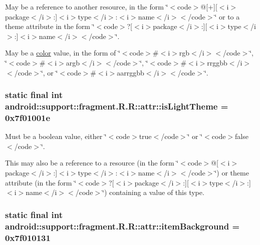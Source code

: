 May be a reference to another resource, in the form \char`\"{}$<$code$>$@\mbox{[}+\mbox{]}\mbox{[}$<$i$>$package$<$/i$>$:\mbox{]}$<$i$>$type$<$/i$>$:$<$i$>$name$<$/i$>$$<$/code$>$\char`\"{} or to a theme attribute in the form \char`\"{}$<$code$>$?\mbox{[}$<$i$>$package$<$/i$>$:\mbox{]}\mbox{[}$<$i$>$type$<$/i$>$:\mbox{]}$<$i$>$name$<$/i$>$$<$/code$>$\char`\"{}. 

May be a \hyperlink{classandroid_1_1support_1_1fragment_1_1_r_1_1color}{color} value, in the form of \char`\"{}$<$code$>$\#$<$i$>$rgb$<$/i$>$$<$/code$>$\char`\"{}, \char`\"{}$<$code$>$\#$<$i$>$argb$<$/i$>$$<$/code$>$\char`\"{}, \char`\"{}$<$code$>$\#$<$i$>$rrggbb$<$/i$>$$<$/code$>$\char`\"{}, or \char`\"{}$<$code$>$\#$<$i$>$aarrggbb$<$/i$>$$<$/code$>$\char`\"{}. \hypertarget{classandroid_1_1support_1_1fragment_1_1_r_1_1attr_2c313e9b5196a65d2f09c3b8c585b268}{
\subsubsection[{isLightTheme}]{\setlength{\rightskip}{0pt plus 5cm}static final int android::support::fragment.R.R::attr::isLightTheme = 0x7f01001e}}
\label{classandroid_1_1support_1_1fragment_1_1_r_1_1attr_2c313e9b5196a65d2f09c3b8c585b268}


Must be a boolean value, either \char`\"{}$<$code$>$true$<$/code$>$\char`\"{} or \char`\"{}$<$code$>$false$<$/code$>$\char`\"{}. 

This may also be a reference to a resource (in the form \char`\"{}$<$code$>$@\mbox{[}$<$i$>$package$<$/i$>$:\mbox{]}$<$i$>$type$<$/i$>$:$<$i$>$name$<$/i$>$$<$/code$>$\char`\"{}) or theme attribute (in the form \char`\"{}$<$code$>$?\mbox{[}$<$i$>$package$<$/i$>$:\mbox{]}\mbox{[}$<$i$>$type$<$/i$>$:\mbox{]}$<$i$>$name$<$/i$>$$<$/code$>$\char`\"{}) containing a value of this type. \hypertarget{classandroid_1_1support_1_1fragment_1_1_r_1_1attr_809299b1a94a22af9519173ad702fafb}{
\subsubsection[{itemBackground}]{\setlength{\rightskip}{0pt plus 5cm}static final int android::support::fragment.R.R::attr::itemBackground = 0x7f010131}}
\label{classandroid_1_1support_1_1fragment_1_1_r_1_1attr_809299b1a94a22af9519173ad702fafb}


